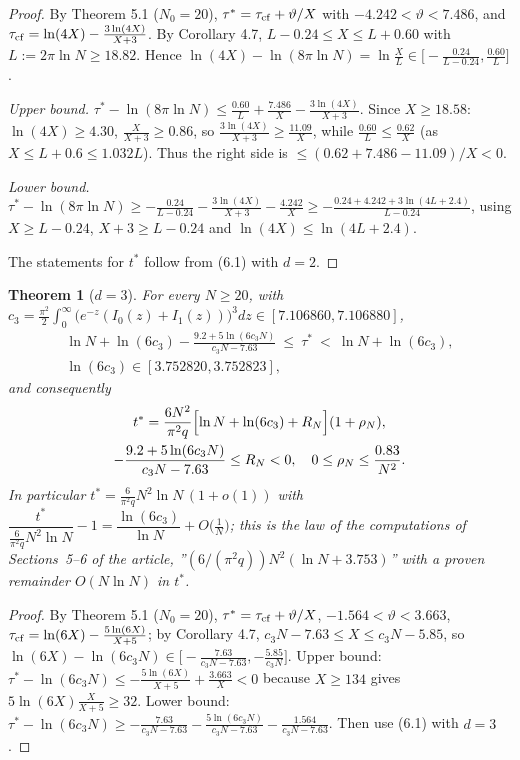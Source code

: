 \documentclass[11pt,a4paper]{article}
\newtheorem{theorem}{Theorem}[section]
\theoremstyle{definition}
\theoremstyle{remark}
\begin{document}
\begin{proof}
By Theorem 5.1 ($N_0=20$), $\tau^*=\tau_{\rm cf}+\vartheta/X$ with $-4.242<\vartheta<7.486$, and $\tau_{\rm cf}=\ln(4X)-\frac{3\ln(4X)}{X+3}$. By Corollary 4.7, $L-0.24\le X\le L+0.60$ with $L:=2\pi\ln N\ge18.82$. Hence $\ln(4X)-\ln(8\pi\ln N)=\ln\frac XL\in\bigl[-\frac{0.24}{L-0.24},\frac{0.60}{L}\bigr]$.

\emph{Upper bound.} $\tau^*-\ln(8\pi\ln N)\le\frac{0.60}L+\frac{7.486}{X}-\frac{3\ln(4X)}{X+3}$. Since $X\ge18.58$: $\ln(4X)\ge4.30$, $\frac{X}{X+3}\ge0.86$, so $\frac{3\ln(4X)}{X+3}\ge\frac{11.09}{X}$, while $\frac{0.60}{L}\le\frac{0.62}{X}$ (as $X\le L+0.6\le1.032L$). Thus the right side is $\le(0.62+7.486-11.09)/X<0$.

\emph{Lower bound.} $\tau^*-\ln(8\pi\ln N)\ge-\frac{0.24}{L-0.24}-\frac{3\ln(4X)}{X+3}-\frac{4.242}{X}\ge-\frac{0.24+4.242+3\ln(4L+2.4)}{L-0.24}$, using $X\ge L-0.24$, $X+3\ge L-0.24$ and $\ln(4X)\le\ln(4L+2.4)$.

The statements for $t^*$ follow from (6.1) with $d=2$.
\end{proof}

\begin{theorem}[{$d=3$}]
For every $N\ge20$, with $c_3=\frac{\pi^2}{2}\int_0^\infty\bigl(e^{-z}(I_0(z)+I_1(z))\bigr)^3dz\in[7.106860,7.106880]$,
\begin{gather*}
\ln N+\ln(6c_3)-\frac{9.2+5\ln(6c_3N)}{c_3N-7.63}\ \le\ \tau^*\ <\ \ln N+\ln(6c_3), \\
\ln(6c_3)\in[3.752820,3.752823],
\end{gather*}
and consequently
\begin{gather*}
t^*=\frac{6N^2}{\pi^2q}\Bigl[\ln N+\ln(6c_3)+R_N\Bigr](1+\rho_N), \\
-\frac{9.2+5\ln(6c_3N)}{c_3N-7.63}\le R_N<0,\quad0\le\rho_N\le\frac{0.83}{N^2}.
\end{gather*}
In particular $t^*=\frac{6}{\pi^2q}N^2\ln N\,(1+o(1))$ with $\dfrac{t^*}{\frac{6}{\pi^2q}N^2\ln N}-1=\dfrac{\ln(6c_3)}{\ln N}+O\bigl(\tfrac1N\bigr)$; this is the law of the computations of Sections~5--6 of the article, ''$(6/(\pi^2q))N^2(\ln N+3.753)$'' with a proven remainder $O(N\ln N)$ in $t^*$.
\end{theorem}

\begin{proof}
By Theorem 5.1 ($N_0=20$), $\tau^*=\tau_{\rm cf}+\vartheta/X$, $-1.564<\vartheta<3.663$, $\tau_{\rm cf}=\ln(6X)-\frac{5\ln(6X)}{X+5}$; by Corollary 4.7, $c_3N-7.63\le X\le c_3N-5.85$, so $\ln(6X)-\ln(6c_3N)\in\bigl[-\frac{7.63}{c_3N-7.63},-\frac{5.85}{c_3N}\bigr]$. Upper bound: $\tau^*-\ln(6c_3N)\le-\frac{5\ln(6X)}{X+5}+\frac{3.663}{X}<0$ because $X\ge134$ gives $5\ln(6X)\frac{X}{X+5}\ge32$. Lower bound: $\tau^*-\ln(6c_3N)\ge-\frac{7.63}{c_3N-7.63}-\frac{5\ln(6c_3N)}{c_3N-7.63}-\frac{1.564}{c_3N-7.63}$. Then use (6.1) with $d=3$.
\end{proof}
\end{document}
